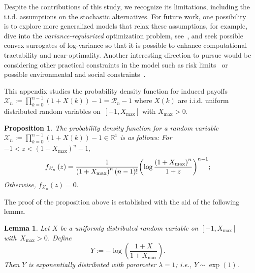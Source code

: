 \documentclass[letterpaper, 10 pt, journal, twoside]{IEEEtran}  %
\newtheorem{lemma}[theorem]{Lemma}
\newtheorem{proposition}[theorem]{Proposition}
\begin{document}
    Despite the contributions of this study, we recognize its limitations, including the i.i.d. assumptions on the stochastic alternatives. 
    For future work, one possibility is to explore more generalized models that relax these assumptions, for example, dive into the \textit{variance-regularized} optimization problem, see~\cite{duchi2019variance}, and seek possible convex surrogates of log-variance so that it is possible to enhance computational tractability and near-optimality.  
    Another interesting direction to pursue would be considering other practical constraints in the model such as risk limits~\cite{jorion2007value} or possible environmental and social constraints~\cite{eccles2014impact}.

 
 \appendix
\label{Induced Return:Uniform_Distribution}
This appendix studies the probability density function for induced payoffs
$\mathcal{X}_n := \prod_{k=0}^{n-1} (1+X(k)) -1 = \mathcal{R}_n - 1$
where $X(k)$ are i.i.d. uniform distributed random variables on~$[ -1, X_{\max}]$ with $X_{\max} > 0$. 


\begin{proposition} \label{proposition: Erlang compound return}
    The probability density function for a random variable $\mathcal{X}_n := \prod_{k=0}^{n-1} (1+X(k)) -1  \in \mathbb{R}^1$ is as follows: For $ - 1 < z < \left( 1 + X_{\max } \right)^n - 1$, 
\[
f_{{\cal X}_n } \left( z \right) = \frac{1}{{{{(1 + {X_{\max }})}^n}\left( {n - 1} \right)!}}{\left( {\log \frac{{{{(1 + {X_{\max }})}^n}}}{{1 + z}}} \right)^{n - 1}};
\]	
Otherwise, $f_{\mathcal{X}_n}(z)=0.$
\end{proposition}

 

 The proof of the proposition above is established with the aid of the following lemma.

\begin{lemma} \label{lemma: auxiliary lemma}
    Let $X$ be a uniformly distributed random variable on $[-1, X_{\max}]$ with~$X_{\max} >0$. Define 
	$$
	Y := - \log \left( \frac{1 + X }{1+X_{\max}} \right).
	$$ 
 Then $Y$ is exponentially distributed with parameter $\lambda=1$; i.e., $Y \sim \exp(1)$. 
\end{lemma}
 
\end{document}

